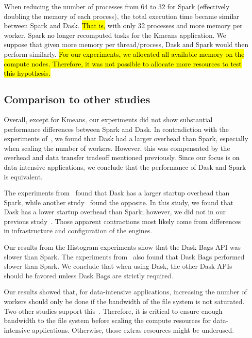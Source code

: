 \documentclass[AMA,STIX1COL]{WileyNJD-v2}
\newcommand{\HL}[1]{\hl{#1}}
\begin{document}
When reducing the number of processes from 64 to 32 for Spark (effectively doubling the memory of each process), the total execution time became similar between Spark and Dask.
\HL{That is,} with only 32 processes and more memory per worker, Spark no longer recomputed tasks for the Kmeans application.
We suppose that given more memory per thread/process, Dask and Spark would then perform similarly.
\HL{For our experiments, we allocated all available memory on the compute nodes.
Therefore, it was not possible to allocate more resources to test this hypothesis.}
		
\subsection{Comparison to other studies}
Overall, except for Kmeans, our experiments did not show substantial performance differences between Spark and Dask.
In contradiction with the experiments of~\cite{Mehta:17}, we found that Dask had a larger overhead than Spark, especially when scaling the number of workers.
However, this was compensated by the overhead and data transfer tradeoff mentioned previously.
Since our focus is on data-intensive applications, we conclude that the performance of Dask and Spark is equivalent.
		
The experiments from~\cite{Mehta:17} found that Dask has a larger startup overhead than Spark, while another study~\cite{8588652} found the opposite.
In this study, we found that Dask has a lower startup overhead than Spark; however, we did not in our previous study~\cite{8943502}.
Those apparent contractions most likely come from differences in infrastructure and configuration of the engines.
		
Our results from the Histogram experiments show that the Dask Bags API was slower than Spark.
The experiments from~\cite{10.1145/3225058.3225128} also found that Dask Bags performed slower than Spark.
We conclude that when using Dask, the other Dask APIs should be favored unless Dask Bags are strictly required.
		
Our results showed that, for data-intensive applications, increasing the number of workers should only be done if the bandwidth of the file system is not saturated.
Two other studies support this~\cite{8943502, 8588652}.
Therefore, it is critical to ensure enough bandwidth to the file system before scaling the compute resources for data-intensive applications.
Otherwise, those extras resources might be underused.
		
\end{document}
